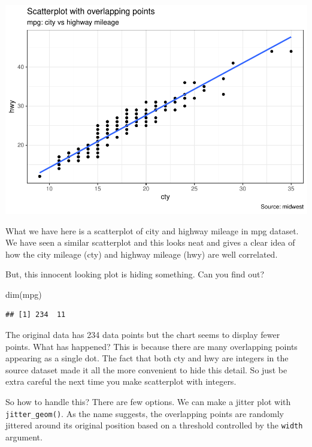 \documentclass[a4paper]{article}
\newenvironment{Shaded}{}{}
\newcommand{\KeywordTok}[1]{\textcolor[rgb]{0.00,0.00,1.00}{#1}}
\newcommand{\NormalTok}[1]{#1}
\begin{document}
\includegraphics{M24-ggplot2_Gallery_files/figure-latex/unnamed-chunk-3-1.pdf}
\newpage

What we have here is a scatterplot of city and highway mileage in mpg
dataset. We have seen a similar scatterplot and this looks neat and
gives a clear idea of how the city mileage (cty) and highway mileage
(hwy) are well correlated.

But, this innocent looking plot is hiding something. Can you find out?

\begin{Shaded}
\begin{Highlighting}[]
\KeywordTok{dim}\NormalTok{(mpg)}
\end{Highlighting}
\end{Shaded}

\begin{verbatim}
## [1] 234  11
\end{verbatim}

The original data has 234 data points but the chart seems to display
fewer points. What has happened? This is because there are many
overlapping points appearing as a single dot. The fact that both cty and
hwy are integers in the source dataset made it all the more convenient
to hide this detail. So just be extra careful the next time you make
scatterplot with integers.

So how to handle this? There are few options. We can make a jitter plot
with \texttt{jitter\_geom()}. As the name suggests, the overlapping
points are randomly jittered around its original position based on a
threshold controlled by the \texttt{width} argument.
\end{document}
